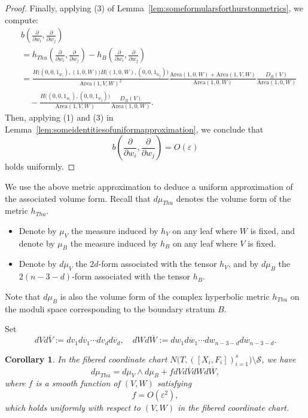 \documentclass{compositio}
\numberwithin{equation}{section}
\numberwithin{figure}{section}
\theoremstyle{definition}
\theoremstyle{plain}
\newtheorem{corollary}[definition]{Corollary}
\begin{document}
{\begin{proof}
Finally, applying (3) of Lemma~\ref{lem:someformularsforthurstonmetrics}, we compute:
\begin{align*}
    &b\left(\frac{\partial}{\partial w_i}, \frac{\partial}{\partial w_j}\right)\\ 
    &= h_{Thu}\left(\frac{\partial}{\partial w_i}, \frac{\partial}{\partial w_j}\right) - h_B\left(\frac{\partial}{\partial w_i}, \frac{\partial}{\partial w_j}\right)\\
    &= \frac{H\big((0,0, 1_{w_i}),(1,0,W)\big) H\big((1,0,W),(0,0, 1_{w_j})\big)}{\mathrm{Area}(1,V,W)^2} \frac{\mathrm{Area}(1,0,W) + \mathrm{Area}(1,V,W)}{\mathrm{Area}(1,0,W)}\frac{D_B(V)}{\mathrm{Area}(1,0,W)} \\ 
    &\quad - \frac{H\big((0,0,1_{w_i}),(0,0,1_{w_j})\big)}{\mathrm{Area}(1,V,W)}\frac{D_B(V)}{\mathrm{Area}(1,0,W)}.
\end{align*}
Then, applying (1) and (3) in Lemma~\ref{lem:someidentitiesofuniformapproximation}, we conclude that
$$
b\left(\frac{\partial}{\partial w_i}, \frac{\partial}{\partial w_j}\right) = O(\varepsilon)
$$
holds uniformly.
\end{proof}

We use the above metric approximation to deduce a uniform approximation of the associated volume form. Recall that $d\mu_{Thu}$ denotes the volume form of the metric $h_{Thu}$. 
\begin{itemize}
    \item Denote by $\mu_V$ the measure induced by $h_V$ on any leaf where $W$ is fixed, and denote by $\mu_B$ the measure induced by $h_B$ on any leaf where $V$ is fixed.
    \item Denote by $d\mu_V$ the $2d$-form associated with the tensor $h_V$, and by $d\mu_B$ the $2(n-3-d)$-form associated with the tensor $h_B$.
\end{itemize}
Note that $d\mu_B$ is also the volume form of the complex hyperbolic metric $h_{Thu}$ on the moduli space corresponding to the boundary stratum $B$.\newline

Set
$$
dV d\overline{V} := dv_1 d\overline{v}_1 \cdots dv_d d\overline{v}_d, 
\quad
dW d\overline{W} := dw_1 d\overline{w}_1 \cdots dw_{n-3-d} d\overline{w}_{n-3-d}.
$$


\begin{corollary}\label{cor:volumeformapproximation}
      In the fibered coordinate chart $N\big(T, ([X_i, F_i])_{i=1}^s\big) \setminus \mathcal{S}$, we have
     \begin{equation}\label{equ:volumeformsasymptotics}
         d\mu_{Thu} = d\mu_V \wedge d\mu_B + f dV d\overline{V} dW d\overline{W},
     \end{equation}
     where $f$ is a smooth function of $(V,W)$ satisfying
     \begin{equation}
         f = O(\varepsilon^2),
     \end{equation}
     which holds uniformly with respect to $(V,W)$ in the fibered coordinate chart.
\end{corollary}

}
\end{document}
